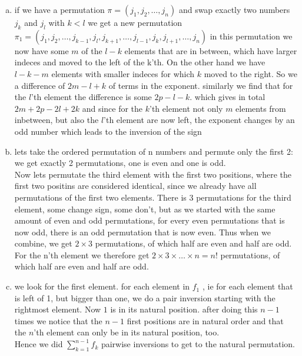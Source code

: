 \documentclass[a4paper,10pt]{article}
\begin{document}
\begin{enumerate}[(a)]
	\item if we have a permutation $\pi=(j_1,j_2,\dots,j_n)$ and swap exactly two numbers $j_k$ and $j_l$ with $k<l$
		we get a new permutation
		$\pi_1=(j_1,j_2,\dots,j_{k-1},j_l,j_{k+1},\dots,j_{l-1},j_k,j_{l+1},\dots,j_n)$ in this permutation we now have some $m$ of the
		$l-k$	elements that are in between, which have larger indeces and moved to the left of the k'th. On the other hand we have  $l-k-m$ elements with smaller indeces for which $k$ moved to the right. So we a difference of $2m-l+k$ of terms in the exponent. similarly we find that for the $l$'th element the  difference is some $2p-l-k$. which gives in total $2m+2p-2l+2k$ and since for the $k$'th element not only $m$ elements from inbetween, but also the $l$'th element are now left, the exponent changes by an odd number which leads to the inversion of the sign
	\item  lets take the ordered permutation of n numbers and permute only the first 2: we get exactly 2 permutations, one is even and one is odd.\\
		Now lets permutate the third element with the first two positions, where the first two positins are considered identical, since we already have all permutations of the first two elements.
		There is 3 permutations for the third element, some change sign, some don't, but as we started with the same amount of even and odd permutations, for every even permutations that is now odd, there is an odd permutation that is now even.
		Thus when we combine, we get $2\times3$ permutations, of which half are even and half are odd. \\
		For the n'th element we therefore get $2\times3\times\dots\times n = n!$ permutations, of which half are even and half are odd.
	\item we look for the first element. for each element in $f_1$ , ie for each element that is left of 1, but bigger than one, we do a pair inversion starting with the rightmost element. Now $1$ is in its natural position. after doing this $n-1$ times we notice that the $n-1$ first positions are in natural order and that the $n$'th element can only be in its natural position, too. \\
		Hence we did $\sum\limits_{k=1}^{n-1}f_k$ pairwise inversions to get to the natural permutation.
\end{enumerate}
\end{document}
